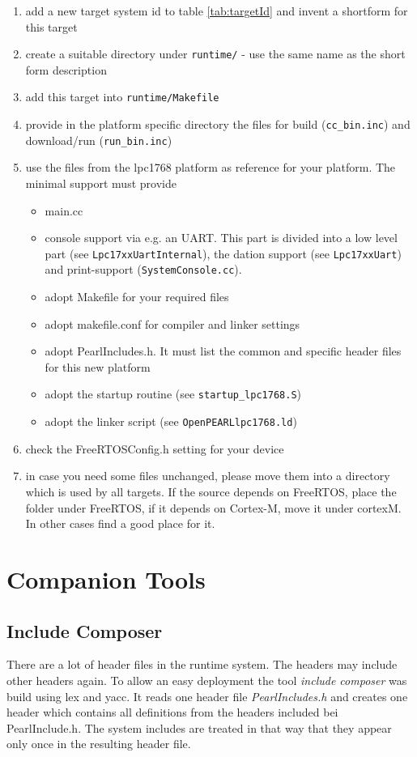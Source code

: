 	\begin{enumerate}
	\item add a new target system id to table \ref{tab:targetId} and 
	      invent a shortform for this target
	\item create a suitable directory under \verb|runtime/| - use the same name
	   as the short form description
	\item add this target into \verb|runtime/Makefile| 
	\item provide in the platform specific directory the files for
	      build (\verb|cc_bin.inc|) and download/run (\verb|run_bin.inc|)
	\item use the files from the lpc1768 platform as reference for your
	      platform. The minimal support must provide 
	      \begin{itemize}
	      \item main.cc
	      \item console support via e.g. an UART. This part is divided
		    into a low level part (see \verb|Lpc17xxUartInternal|), 
		    the dation support (see \verb|Lpc17xxUart|)
		    and print-support (\verb|SystemConsole.cc|).
	      \item adopt Makefile for your required files
	      \item adopt makefile.conf for compiler and linker settings
	      \item adopt PearlIncludes.h. It must list the common and specific 
		    header files for this new platform
	      \item adopt the startup routine (see \verb|startup_lpc1768.S|)
	      \item adopt the linker script (see \verb|OpenPEARLlpc1768.ld|)
	      \end{itemize}
	\item check the FreeRTOSConfig.h setting for your device
	\item in case you need some files unchanged, please move them into a 
	      directory which is used by all targets. If the source depends on
	      FreeRTOS, place the folder under FreeRTOS, if it depends on 
	      Cortex-M, move it under cortexM. In other cases find a good place for
	      it.
	\end{enumerate}

	\section{Companion Tools}
	\subsection{Include Composer}
	There are a lot of header files in the runtime system. 
	The headers may include other headers again.
	To allow an easy deployment the tool {\em include composer} 
	was build using lex and yacc. It reads one header file {\em PearlIncludes.h}
	and creates one header which contains all definitions from the headers
	included bei PearlInclude.h. The system includes are treated in that way
	that they appear only once in the resulting header file.


